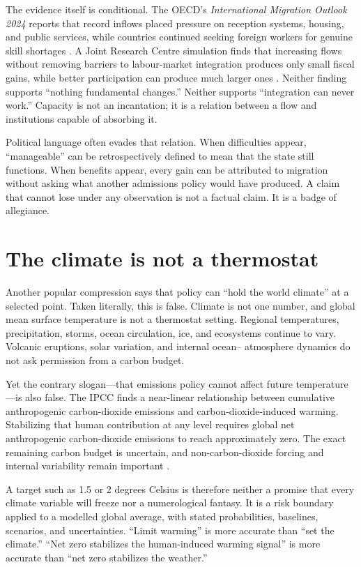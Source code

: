 ﻿\documentclass[12pt,a4paper]{book}
\begin{document}
The evidence itself is conditional.  The OECD's \emph{International Migration
Outlook 2024} reports that record inflows placed pressure on reception systems,
housing, and public services, while countries continued seeking foreign
workers for genuine skill shortages \cite{OECDMigrationOutlook2024}.  A Joint
Research Centre simulation finds that increasing flows without removing
barriers to labour-market integration produces only small fiscal gains, while
better participation can produce much larger ones
\cite{JRCFiscalMigration2020}.  Neither finding supports ``nothing fundamental
changes.''  Neither supports ``integration can never work.''  Capacity is not
an incantation; it is a relation between a flow and institutions capable of
absorbing it.

Political language often evades that relation.  When difficulties appear,
``manageable'' can be retrospectively defined to mean that the state still
functions.  When benefits appear, every gain can be attributed to migration
without asking what another admissions policy would have produced.  A claim
that cannot lose under any observation is not a factual claim.  It is a badge
of allegiance.

\section{The climate is not a thermostat}

Another popular compression says that policy can ``hold the world climate'' at
a selected point.  Taken literally, this is false.  Climate is not one number,
and global mean surface temperature is not a thermostat setting.  Regional
temperatures, precipitation, storms, ocean circulation, ice, and ecosystems
continue to vary.  Volcanic eruptions, solar variation, and internal ocean--
atmosphere dynamics do not ask permission from a carbon budget.

Yet the contrary slogan---that emissions policy cannot affect future
temperature---is also false.  The IPCC finds a near-linear relationship between
cumulative anthropogenic carbon-dioxide emissions and carbon-dioxide-induced
warming.  Stabilizing that human contribution at any level requires global net
anthropogenic carbon-dioxide emissions to reach approximately zero.  The exact
remaining carbon budget is uncertain, and non-carbon-dioxide forcing and
internal variability remain important \cite{IPCCWGI2021TechnicalSummary}.

A target such as 1.5 or 2 degrees Celsius is therefore neither a promise that
every climate variable will freeze nor a numerological fantasy.  It is a risk
boundary applied to a modelled global average, with stated probabilities,
baselines, scenarios, and uncertainties.  ``Limit warming'' is more accurate
than ``set the climate.''  ``Net zero stabilizes the human-induced warming
signal'' is more accurate than ``net zero stabilizes the weather.''
\end{document}
